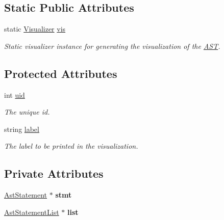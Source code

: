 \subsection*{Static Public Attributes}
\begin{DoxyCompactItemize}
\item 
\hypertarget{classAST_aca9e6637209b31e03a09c0d42f29bdfa}{static \hyperlink{classVisualizer}{Visualizer} \hyperlink{classAST_aca9e6637209b31e03a09c0d42f29bdfa}{vis}}\label{classAST_aca9e6637209b31e03a09c0d42f29bdfa}

\begin{DoxyCompactList}\small\item\em Static visualizer instance for generating the visualization of the \hyperlink{classAST}{A\-S\-T}. \end{DoxyCompactList}\end{DoxyCompactItemize}
\subsection*{Protected Attributes}
\begin{DoxyCompactItemize}
\item 
\hypertarget{classAST_a847b778f1c3dd5a19de32de432ee6e15}{int \hyperlink{classAST_a847b778f1c3dd5a19de32de432ee6e15}{uid}}\label{classAST_a847b778f1c3dd5a19de32de432ee6e15}

\begin{DoxyCompactList}\small\item\em The unique id. \end{DoxyCompactList}\item 
\hypertarget{classAST_ab2e239ccc0688d2341724432ff5a1a31}{string \hyperlink{classAST_ab2e239ccc0688d2341724432ff5a1a31}{label}}\label{classAST_ab2e239ccc0688d2341724432ff5a1a31}

\begin{DoxyCompactList}\small\item\em The label to be printed in the visualization. \end{DoxyCompactList}\end{DoxyCompactItemize}
\subsection*{Private Attributes}
\begin{DoxyCompactItemize}
\item 
\hypertarget{classAstStatementList_af53d733dee93a0c5740e1983e0ee5d78}{\hyperlink{classAstStatement}{Ast\-Statement} $\ast$ {\bfseries stmt}}\label{classAstStatementList_af53d733dee93a0c5740e1983e0ee5d78}

\item 
\hypertarget{classAstStatementList_ae730c57d9b75272e9792b175564a756e}{\hyperlink{classAstStatementList}{Ast\-Statement\-List} $\ast$ {\bfseries list}}\label{classAstStatementList_ae730c57d9b75272e9792b175564a756e}

\end{DoxyCompactItemize}


